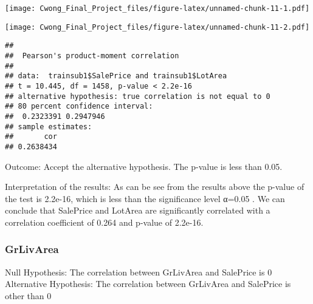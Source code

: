 \documentclass[]{article}
\newenvironment{Shaded}{\begin{snugshade}}{\end{snugshade}}
\newcommand{\KeywordTok}[1]{\textcolor[rgb]{0.13,0.29,0.53}{\textbf{#1}}}
\newcommand{\DataTypeTok}[1]{\textcolor[rgb]{0.13,0.29,0.53}{#1}}
\newcommand{\FloatTok}[1]{\textcolor[rgb]{0.00,0.00,0.81}{#1}}
\newcommand{\StringTok}[1]{\textcolor[rgb]{0.31,0.60,0.02}{#1}}
\newcommand{\OperatorTok}[1]{\textcolor[rgb]{0.81,0.36,0.00}{\textbf{#1}}}
\newcommand{\NormalTok}[1]{#1}
\begin{document}
\texttt{[image: Cwong\_Final\_Project\_files/figure-latex/unnamed-chunk-11-1.pdf]}

\begin{Shaded}
\end{Shaded}

\texttt{[image: Cwong\_Final\_Project\_files/figure-latex/unnamed-chunk-11-2.pdf]}

\begin{Shaded}
\end{Shaded}

\begin{verbatim}
## 
##  Pearson's product-moment correlation
## 
## data:  trainsub1$SalePrice and trainsub1$LotArea
## t = 10.445, df = 1458, p-value < 2.2e-16
## alternative hypothesis: true correlation is not equal to 0
## 80 percent confidence interval:
##  0.2323391 0.2947946
## sample estimates:
##       cor 
## 0.2638434
\end{verbatim}

Outcome: Accept the alternative hypothesis. The p-value is less than
0.05.

Interpretation of the results: As can be see from the results above the
p-value of the test is 2.2e-16, which is less than the significance
level α=0.05 . We can conclude that SalePrice and LotArea are
significantly correlated with a correlation coefficient of 0.264 and
p-value of 2.2e-16.

\subsubsection{GrLivArea}\label{grlivarea}

Null Hypothesis: The correlation between GrLivArea and SalePrice is 0
Alternative Hypothesis: The correlation between GrLivArea and SalePrice
is other than 0
\end{document}
